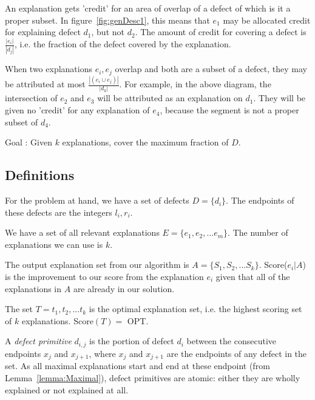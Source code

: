 An explanation gets 'credit' for an area of overlap of a defect of which is it a proper subset. In figure~\ref{fig:genDesc1}, this means that $e_1$ may be allocated credit for explaining defect $d_1$, but not $d_2$.  The amount of credit for covering a defect is $\frac{ | e_i |}{|d_j|}$, i.e. the fraction of the defect covered by the explanation.
 
When two explanations $e_i,e_j$ overlap and both are a subset of a defect, they may be attributed at most $\frac{ | (e_i \cup e_j) |}{|d_k|}$. For example, in the above diagram, the intersection of $e_2$ and $e_3$ will be attributed as an explanation on $d_1$. They will be given no 'credit' for any explanation of $e_4$, because the segment is not a proper subset of $d_4.$

Goal : Given $k$ explanations, cover the maximum fraction of $D$.

\subsection{Definitions} 
\label{sec:definitions}

For the problem at hand, we have a set of defects $D = \{d_i\}$.  The endpoints of these defects are the integers $l_i, r_i$.  

We have a set of all relevant explanations $E = \{e_1, e_2, ... e_m\}$.  The number of explanations we can use is $k$.

The output explanation set from our algorithm is $A = \{S_1, S_2, ... S_k\}$.  Score($e_i | A$) is the improvement to our score from the explanation $e_i$ given that all of the explanations in $A$ are already in our solution.

The set $T = t_1, t_2, ... t_k$ is the optimal explanation set, i.e. the highest scoring set of $k$ explanations.  Score$(T) = $ OPT.

A {\it defect primitive} $d_{i,j}$ is the portion of defect $d_i$ between the consecutive endpoints $x_j$ and $x_{j+1}$, where $x_j$ and $x_{j+1}$ are the endpoints of any defect in the set.  As all maximal explanations start and end at these endpoint (from Lemma~\ref{lemma:Maximal}), defect primitives are atomic: either they are wholly explained or not explained at all.

